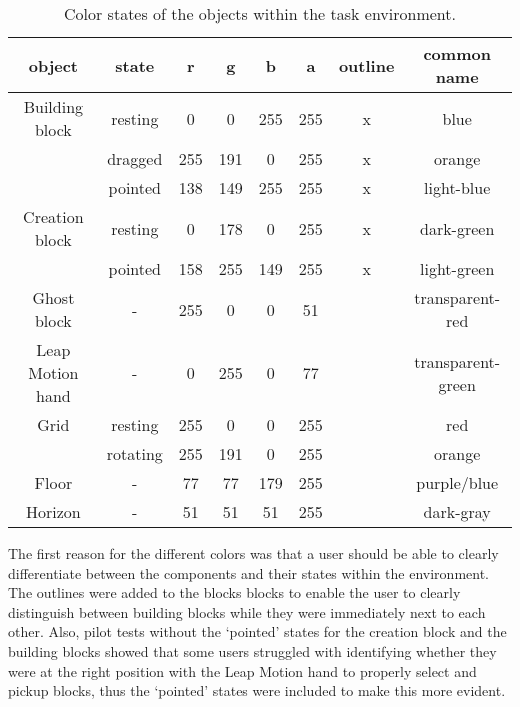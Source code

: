 \begin{table}[H]
\centering
\begin{tabular}{|c|c|c|c|c|c|c|c|}
\hline
\textbf{object} & \textbf{state} & \textbf{r} & \textbf{g} & \textbf{b} & \textbf{a} & \textbf{outline} & \textbf{common name}\\ \hline\hline
Building block & resting & 0 & 0 & 255 & 255 & x & blue \\ 
 & dragged & 255 & 191 & 0 & 255 & x & orange \\ 
 & pointed & 138 & 149 & 255 & 255 & x & light-blue \\ \hline 
Creation block & resting & 0 & 178 & 0 & 255 & x & dark-green \\ 
 & pointed & 158 & 255 & 149 & 255 & x & light-green\\ \hline 
Ghost block & - & 255 & 0 & 0 & 51 & & transparent-red \\ \hline
Leap Motion hand & - & 0 & 255 & 0 & 77 & & transparent-green  \\ \hline 
Grid & resting & 255 & 0 & 0 & 255 & & red \\ 
 & rotating & 255 & 191 & 0 & 255 & & orange \\ \hline 
Floor & - & 77 & 77 & 179 & 255 & & purple/blue \\ \hline 
Horizon & - & 51 & 51 & 51 & 255 & & dark-gray \\ \hline 
\end{tabular}
\caption{\label{tab:colors} Color states of the objects within the task environment.}
\end{table}

\noindent The first reason for the different colors was that a user should be able to clearly differentiate between the components and their states within the environment. 
The outlines were added to the blocks blocks to enable the user to clearly distinguish between building blocks while they were immediately next to each other. Also, pilot
 tests without the `pointed' states for the creation block and the building blocks showed that some users struggled with identifying whether they were at the right position 
 with the Leap Motion hand to properly select and pickup blocks, thus the `pointed' states were included to make this more evident. 

